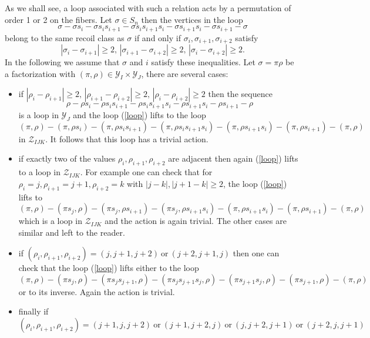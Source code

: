 \documentclass[11pt,a4paper]{amsart}
\theoremstyle{contraction}
\begin{document}
As we shall see,  a loop associated with such a   relation acts by a permutation   of order 1 or 2 on the fibers.
Let $\sigma\in S_n$ then the vertices in the loop 
\begin{equation}\label{loop}
\sigma-\sigma s_i-\sigma s_is_{i+1}-\sigma s_is_{i+1}s_i-\sigma s_{i+1}s_i-\sigma s_{i+1}-\sigma
\end{equation} belong to the same recoil class as $\sigma$ if and only if  $\sigma_i,\sigma_{i+1},\sigma_{i+2}$ satisfy   
$$|\sigma_i-\sigma_{i+1}|\geq 2,\,|\sigma_{i+1}-\sigma_{i+2}|\geq 2, \,|\sigma_{i}-\sigma_{i+2}|\geq 2.$$  
In the following we assume that $\sigma$ and $i$ satisfy these inequalities.
  Let $\sigma=\pi\rho$ be a factorization with $(\pi,\rho)\in {\mathcal Y}_I\times {\mathcal Y}_J$, there are several cases:
 \begin{itemize}
 \item if $|\rho_i-\rho_{i+1}|\geq 2,\,|\rho_{i+1}-\rho_{i+2}|\geq 2, \,|\rho_{i}-\rho_{i+2}|\geq 2$ then the sequence  
 $$\rho-\rho s_i-\rho s_is_{i+1}-\rho s_is_{i+1}s_i-\rho s_{i+1}s_i-\rho s_{i+1}-\rho$$ is a loop in ${\mathcal Y}_J$ and the loop (\ref{loop}) lifts to the loop 
 $$(\pi,\rho)-(\pi,\rho s_i)-(\pi,\rho s_is_{i+1})-(\pi,\rho s_is_{i+1}s_i)-(\pi,\rho s_{i+1}s_i)-(\pi,\rho s_{i+1})-(\pi,\rho)$$
 in ${\mathcal Z}_{IJK}$. It follows that this loop has a trivial action.
 \item if exactly two of the values $\rho_{i},\rho_{i+1},\rho_{i+2}$ are adjacent then again (\ref{loop}) lifts to a loop in ${\mathcal Z}_{IJK}$. For example one can  check that for $\rho_{i}=j,\rho_{i+1}=j+1,\rho_{i+2}=k$ with $|j-k|,|j+1-k|\geq 2$, the loop
 (\ref{loop}) lifts to 
 $$(\pi,\rho)-(\pi s_j,\rho) -(\pi s_j,\rho s_{i+1})-(\pi s_j,\rho s_{i+1}s_i)-(\pi,\rho s_{i+1}s_i)-(\pi,\rho s_{i+1})-(\pi,\rho)$$ which is a loop in ${\mathcal Z}_{IJK}$ and the action is again trivial. The other cases are similar and left to the reader.
 \item if $(\rho_{i},\rho_{i+1},\rho_{i+2})=(j,j+1,j+2)\ \text{or}\ (j+2,j+1,j)$ then one can check that the loop  (\ref{loop}) lifts either to the loop
 $$(\pi,\rho)-(\pi s_j,\rho) -(\pi s_js_{j+1},\rho )-(\pi s_js_{j+1}s_j,\rho)
  -(\pi s_{j+1}s_j,\rho )-(\pi s_{j+1},\rho )-(\pi,\rho)$$ 
  or to its inverse. Again the action is trivial.
  \item finally if 
  \begin{equation}\label{eq:rhoj}
  (\rho_{i},\rho_{i+1},\rho_{i+2})=(j+1,j,j+2)\ \text{or}\ (j+1,j+2,j)\ \text{or}\ (j,j+2,j+1)\ \text{or}\ (j+2,j,j+1)\end{equation}

\end{itemize}
\end{document}

